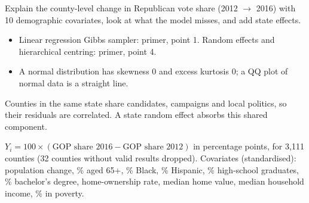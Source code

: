 \documentclass[11pt]{article}
\begin{document}
\begin{restate}
Explain the county-level change in Republican vote share (2012 $\to$ 2016) with 10 demographic covariates, look at what the model misses, and add state effects.
\end{restate}

\begin{recall}
\begin{itemize}
\item Linear regression Gibbs sampler: primer, point 1. Random effects and hierarchical centring: primer, point 4.
\item A normal distribution has skewness 0 and excess kurtosis 0; a QQ plot of normal data is a straight line.
\end{itemize}
\end{recall}

\begin{keyidea}
Counties in the same state share candidates, campaigns and local politics, so their residuals are correlated. A state random effect absorbs this shared component.
\end{keyidea}

\solution
{} $Y_i=100\times(\text{GOP share 2016}-\text{GOP share 2012})$ in percentage points, for 3{,}111 counties (32 counties without valid results dropped). Covariates (standardised): population change, \% aged 65+, \% Black, \% Hispanic, \% high-school graduates, \% bachelor's degree, home-ownership rate, median home value, median household income, \% in poverty.
\end{document}
